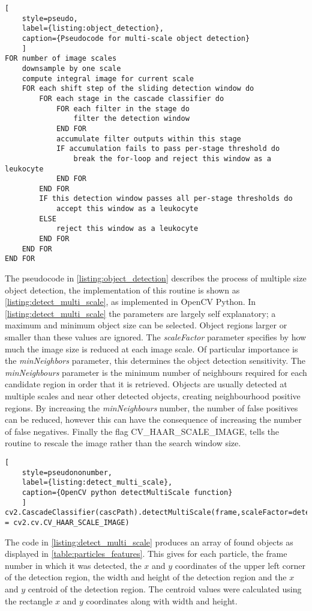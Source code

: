 \begin{lstlisting}[
	style=pseudo,
	label={listing:object_detection},
	caption={Pseudocode for multi-scale object detection}
	]
FOR number of image scales
	downsample by one scale
	compute integral image for current scale
	FOR each shift step of the sliding detection window do
		FOR each stage in the cascade classifier do
			FOR each filter in the stage do
				filter the detection window
			END FOR
			accumulate filter outputs within this stage
			IF accumulation fails to pass per-stage threshold do
				break the for-loop and reject this window as a leukocyte
			END FOR
		END FOR
		IF this detection window passes all per-stage thresholds do
			accept this window as a leukocyte
		ELSE
			reject this window as a leukocyte
		END FOR
	END FOR
END FOR
\end{lstlisting}
The pseudocode in \autoref{listing:object_detection} describes the process of multiple size object detection, the implementation of this routine is shown as \autoref{listing:detect_multi_scale}, as implemented in OpenCV Python. In \autoref{listing:detect_multi_scale} the parameters are largely self explanatory; a maximum and minimum object size can be selected. Object regions larger or smaller than these values are ignored. The \emph{scaleFactor} parameter specifies by how much the image size is reduced at each image scale. Of particular importance is the \emph{minNeighbors} parameter, this determines the object detection sensitivity. The \emph{minNeighbours} parameter is the minimum number of neighbours required for each candidate region in order that it is retrieved. Objects are usually detected at multiple scales and near other detected objects, creating neighbourhood positive regions. By increasing the \emph{minNeighbours} number, the number of false positives can be reduced, however this can have the consequence of increasing the number of false negatives. Finally the flag CV\_HAAR\_SCALE\_IMAGE, tells the routine to rescale the image rather than the search window size.

\begin{lstlisting}[
	style=pseudononumber,
	label={listing:detect_multi_scale},
	caption={OpenCV python detectMultiScale function}
	]
cv2.CascadeClassifier(cascPath).detectMultiScale(frame,scaleFactor=detectParticlesScaleFactor,minNeighbors=detectParticlesMinNeighbors,minSize=detectParticlesMinSize,maxSize=detectParticlesMaxSize,flags = cv2.cv.CV_HAAR_SCALE_IMAGE)
\end{lstlisting}

The code in \autoref{listing:detect_multi_scale} produces an array of found objects as displayed in \autoref{table:particles_features}. This gives for each particle, the frame number in which it was detected, the $x$ and $y$ coordinates of the upper left corner of the detection region, the width and height of the detection region and the $x$ and $y$ centroid of the detection region. The centroid values were calculated using the rectangle $x$ and $y$ coordinates along with width and height.


